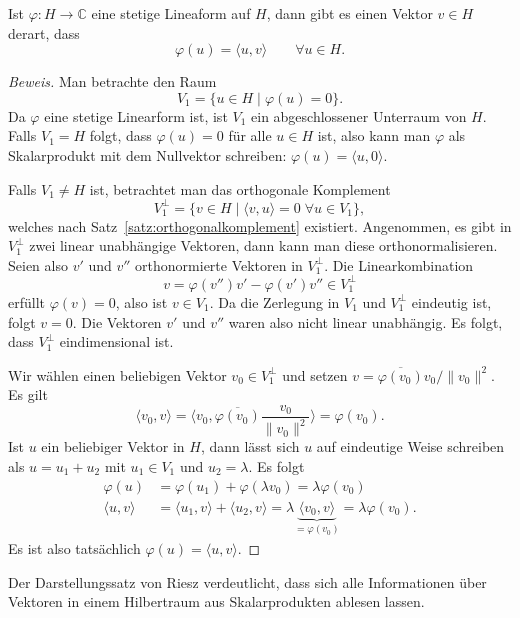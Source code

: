 \begin{satz}[Riesz]
\label{geometrie:satz:riesz}
Ist $\varphi\colon H\to \mathbb C$ eine stetige Lineaform auf $H$, dann 
gibt es einen Vektor $v\in H$ derart, dass
\[
\varphi(u) = \langle u,v\rangle
\qquad
\forall u\in H.
\]
\end{satz}

\begin{proof}[Beweis]
Man betrachte den Raum
\[
V_1 = \{ u \in H \;|\;\varphi(u)=0\}.
\]
Da $\varphi$ eine stetige Linearform ist, ist $V_1$ ein abgeschlossener
Unterraum von $H$.
Falls $V_1=H$ folgt, dass $\varphi(u)=0$ für alle $u\in H$ ist,
also kann man $\varphi$ als Skalarprodukt mit dem Nullvektor schreiben:
$\varphi(u) = \langle u,0\rangle$.

Falls $V_1 \ne H$ ist, betrachtet man das orthogonale Komplement
\[
V_1^{\perp} = \{ v\in H\;|\; \langle v,u\rangle = 0\; \forall u\in V_1\},
\]
welches nach Satz~\ref{satz:orthogonalkomplement} existiert.
Angenommen, es gibt in $V_1^\perp$ zwei linear unabhängige Vektoren,
dann kann man diese orthonormalisieren.
Seien also $v'$ und $v''$ orthonormierte Vektoren in $V_1^\perp$.
Die Linearkombination
\[
v
=
\varphi(v'') v' - \varphi(v') v''
\in
V_1^\perp
\]
erfüllt $\varphi(v) = 0$, also ist $v\in V_1$.
Da die Zerlegung in $V_1$ und $V_1^\perp$ eindeutig ist, folgt
$v=0$.
Die Vektoren $v'$ und $v''$ waren also nicht linear unabhängig.
Es folgt, dass $V_1^\perp$ eindimensional ist.

Wir wählen einen beliebigen Vektor $v_0\in V_1^\perp$ und
setzen $v = \overline{\varphi(v_0)}v_0/\|v_0\|^2$.
Es gilt 
\[
\langle v_0,v\rangle
=
\biggl\langle v_0,
\overline{\varphi(v_0)}\frac{v_0}{\|v_0\|^2}
\biggr\rangle
=
\varphi(v_0).
\]
Ist $u$ ein beliebiger Vektor in $H$, dann lässt sich $u$ auf eindeutige
Weise schreiben als $u=u_1+u_2$ mit $u_1\in V_1$ und $u_2=\lambda $.
Es folgt
\begin{align*}
\varphi(u)
&=
\varphi(u_1) + \varphi(\lambda v_0)
=
\lambda \varphi(v_0)
\\
\langle u,v\rangle
&=
\langle u_1,v\rangle + \langle u_2,v\rangle
=
\lambda \underbrace{\langle v_0,v\rangle}_{\displaystyle=\varphi(v_0)}
=
\lambda \varphi(v_0).
\end{align*}
Es ist also tatsächlich $\varphi(u)=\langle u,v\rangle$.
\end{proof}

Der Darstellungssatz von Riesz verdeutlicht, dass sich alle Informationen über
Vektoren in einem Hilbertraum aus Skalarprodukten ablesen lassen.
